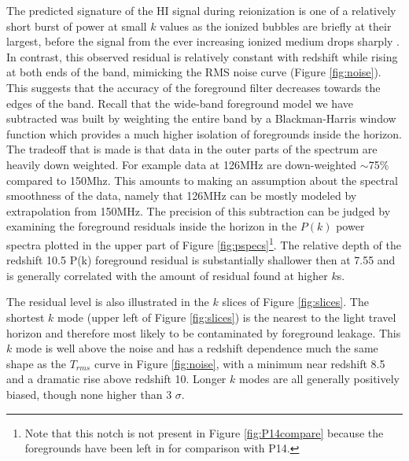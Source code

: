\documentclass{aastex}
\begin{document}
The predicted signature of the HI signal during reionization is one of a relatively short burst of power at small $k$ values as the ionized bubbles are briefly at their largest, before the signal from the ever increasing ionized medium drops sharply \citep{Pritchard:2008p8123}. In contrast, this observed residual is relatively constant with redshift while rising at both ends of the band, mimicking the RMS noise curve (Figure \ref{fig:noise}).  This suggests that the accuracy of the foreground filter decreases towards the edges of the band.  Recall that the wide-band foreground model we have subtracted was built by weighting the entire band by a Blackman-Harris window function which provides a much higher isolation of foregrounds inside the horizon. The tradeoff that is made is that data in the outer parts of the spectrum are heavily down weighted.  For example data at 126MHz are down-weighted $\sim$75\% compared to 150Mhz.  This amounts to making an assumption about the spectral smoothness of the data, namely that 126MHz can be mostly modeled by extrapolation from 150MHz.  The precision of this subtraction can be judged by examining the foreground residuals inside the horizon in the $P(k)$ power spectra plotted in the upper part of Figure \ref{fig:pspecs}\footnote{Note that this notch is not present in Figure \ref{fig:P14compare} because the foregrounds have been left in for comparison with P14.}.  The relative depth of the redshift 10.5 P(k) foreground residual is substantially shallower then at 7.55 and is generally correlated with the amount of residual found at higher $k$s.


The residual level is also illustrated in the $k$ slices of Figure \ref{fig:slices}.  
 The shortest $k$ mode (upper left of Figure \ref{fig:slices}) is the nearest to the light travel horizon and therefore most likely to be contaminated by foreground leakage. This $k$ mode is well above the noise and has a redshift dependence much the same shape as the $T_{rms}$ curve in Figure \ref{fig:noise}, with a minimum near redshift 8.5 and a dramatic rise above redshift 10. Longer $k$ modes are all generally positively biased, though none higher than 3 $\sigma$.
\end{document}
